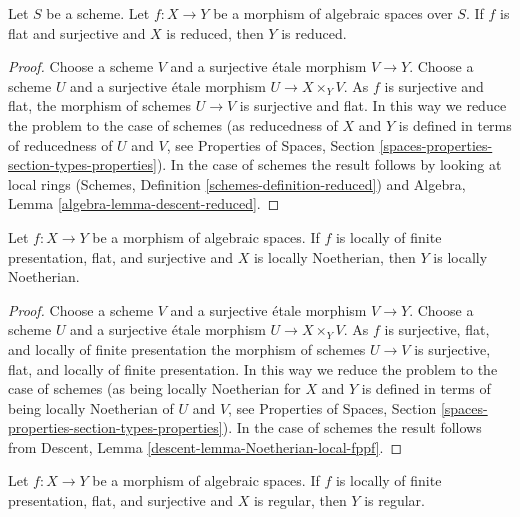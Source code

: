 \begin{lemma}
\label{lemma-descend-reduced}
Let $S$ be a scheme.
Let $f : X \to Y$ be a morphism of algebraic spaces over $S$.
If $f$ is flat and surjective and $X$ is reduced, then $Y$ is reduced.
\end{lemma}

\begin{proof}
Choose a scheme $V$ and a surjective \'etale morphism $V \to Y$.
Choose a scheme $U$ and a surjective \'etale morphism
$U \to X \times_Y V$. As $f$ is surjective and flat, the morphism of
schemes $U \to V$ is surjective and flat. In this way we reduce the
problem to the case of schemes (as reducedness of $X$ and $Y$ is defined
in terms of reducedness of $U$ and $V$, see
Properties of Spaces,
Section \ref{spaces-properties-section-types-properties}).
In the case of schemes the result follows by looking at local rings
(Schemes, Definition \ref{schemes-definition-reduced})
and
Algebra, Lemma \ref{algebra-lemma-descent-reduced}.
\end{proof}

\begin{lemma}
\label{lemma-descend-locally-Noetherian}
Let $f : X \to Y$ be a morphism of algebraic spaces.
If $f$ is locally of finite presentation, flat, and surjective and
$X$ is locally Noetherian, then $Y$ is locally Noetherian.
\end{lemma}

\begin{proof}
Choose a scheme $V$ and a surjective \'etale morphism $V \to Y$.
Choose a scheme $U$ and a surjective \'etale morphism
$U \to X \times_Y V$. As $f$ is surjective, flat, and locally of
finite presentation the morphism of schemes $U \to V$ is surjective, flat, and
locally of finite presentation. In this way we reduce the
problem to the case of schemes (as being locally Noetherian for $X$ and $Y$
is defined in terms of being locally Noetherian of $U$ and $V$, see
Properties of Spaces,
Section \ref{spaces-properties-section-types-properties}).
In the case of schemes the result follows from
Descent, Lemma \ref{descent-lemma-Noetherian-local-fppf}.
\end{proof}

\begin{lemma}
\label{lemma-descend-regular}
Let $f : X \to Y$ be a morphism of algebraic spaces.
If $f$ is locally of finite presentation, flat, and surjective and
$X$ is regular, then $Y$ is regular.
\end{lemma}

